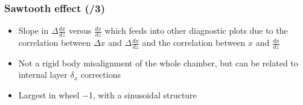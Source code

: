 \documentclass[compress]{beamer}
\begin{document}
\begin{frame}
\frametitle{Sawtooth effect (/3)}

\vspace{0.25 cm}
\begin{itemize}\scriptsize
\item Slope in $\Delta \frac{dx}{dz}$ versus $\frac{dx}{dz}$ which
  feeds into other diagnostic plots due to the correlation between
  $\Delta x$ and $\Delta \frac{dx}{dz}$ and the correlation between
  $x$ and $\frac{dx}{dz}$
\item Not a rigid body misalignment of the whole chamber, but can be related to internal layer $\delta_x$ corrections
\item<2-3> Largest in wheel $-$1, with a sinusoidal structure
\end{itemize}


\end{frame}
\end{document}
